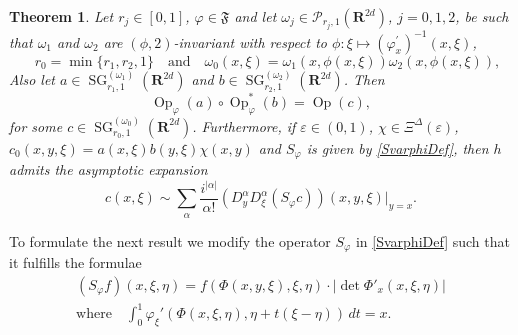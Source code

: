 \documentclass[12pt,a4paper,reqno]{amsart}
\numberwithin{equation}{section}
\newtheorem{thm}{Theorem}
\numberwithin{thm}{section}
\theoremstyle{definition}
\theoremstyle{remark}
\begin{document}
\begin{thm}
\label{thm:3.4}
Let $r_j\in [0,1]$, $\varphi \in {\mathfrak{F}}$ and let $\omega _j
\in {\mathscr P}_{r_j,1}({\mathbf R^{{2d}}})$, $j=0,1,2$, be such that $\omega _1$ and
$\omega _2$ are $(\phi,2)$-invariant
with respect to $\phi \colon
\xi \mapsto (\varphi ^\prime _x)^{-1}(x,\xi)$,
$$
\quad r_0=\min\{r_1,r_2,1\} \quad \text{and}
\quad \omega _0(x,\xi ) =\omega_1(x,\phi (x,\xi ))\omega_{2}(x,\phi (x,\xi )),
$$
Also let $a \in {\operatorname{SG}}^{(\omega _1)} _{r_1,1}({\mathbf R^{{2d}}})$ and
$b \in {\operatorname{SG}}^{(\omega _2)}_{r_2,1}({\mathbf R^{{2d}}})$.
Then
\begin{equation*}
{\operatorname{Op}} _\varphi (a) \circ {\operatorname{Op}} _\varphi ^*(b) = {\operatorname{Op}} (c),
\end{equation*}
for some $c \in {\operatorname{SG}}^{(\omega _0)}_{r_0,1}({\mathbf R^{{2d}}})$.
Furthermore, if ${\varepsilon} \in (0,1)$, $\chi \in \Xi ^\Delta ({\varepsilon} )$,
$c_0(x,y,\xi )= a(x,\xi )b(y,\xi )\chi (x,y)$ and $S_{\varphi}$ is given by
\eqref{SvarphiDef}, then $h$ admits the asymptotic expansion
\begin{equation*}
c(x,\xi) \sim \sum _{\alpha} \frac{i^{|\alpha |}}{\alpha !} 
(D^\alpha _yD^\alpha_\xi (S_{\varphi} c))(x,y,\xi) \big |_{y=x}.
\end{equation*}
\end{thm}

To formulate the next result we modify the operator $S_{\varphi}$ in \eqref{SvarphiDef}
such that it fulfills the formulae
\begin{equation}\label{SvarphiDef2}
\begin{gathered}
(S_{\varphi} f)(x,\xi ,\eta ) = f(\Phi (x,y,\xi ),\xi,\eta )\cdot \left | \det \Phi '_x (x,\xi ,\eta )\right |
\\[1ex]
\text{where}\quad
\int _0^1 {\varphi} _\xi '(\Phi (x,\xi ,\eta ), \eta +t(\xi -\eta ))\, dt =x .
\end{gathered}
\end{equation}

\par
\end{document}
